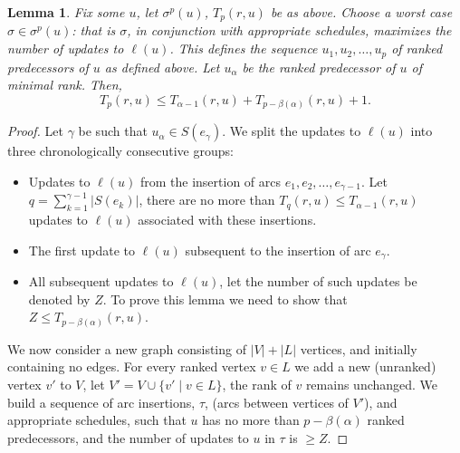 \documentclass[11pt]{article}
\theoremstyle{plain}
\newtheorem{lem}[thm]{Lemma}
\theoremstyle{definition}
\theoremstyle{remark}
\numberwithin{equation}{section}
\begin{document}
\begin{lem}
\label{lem:mapping} Fix some $u$,
  let $\sigma^p(u)$, $T_p(r,u)$ be as above. Choose a worst case $\sigma\in \sigma^p(u)$: that is $\sigma$, in conjunction with appropriate schedules, maximizes the number of updates to $\ell(u)$.
  This defines the sequence  $u_1,u_2,\ldots,u_p$ of ranked predecessors of $u$ as defined above.
  Let $u_\alpha$ be the ranked predecessor of $u$ of minimal rank. Then, $$T_p(r,u) \leq T_{\alpha-1}(r,u) + T_{p-\beta(\alpha)}(r,u) + 1.$$
\end{lem}
\begin{proof}
  Let $\gamma$ be such that $u_{\alpha} \in S(e_\gamma)$.
  We split the updates to $\ell(u)$ into three chronologically consecutive groups:
  \begin{itemize}
    \item Updates to $\ell(u)$ from the insertion of arcs $e_1, e_2, \ldots, e_{\gamma-1}$. Let $q=\sum_{k=1}^{\gamma-1} |S(e_k)|$, there are no more than $T_q(r,u) \leq T_{\alpha-1}(r,u)$ updates to $\ell(u)$ associated with these insertions.
    \item The first update to $\ell(u)$ subsequent to the insertion of arc $e_\gamma$.
    \item \label{split:hard} All subsequent updates to $\ell(u)$, let the number of such updates be denoted by $Z$. To prove this lemma we need to show that
    $Z\leq T_{p-\beta(\alpha)}(r,u)$.
  \end{itemize}

  We now consider a new graph consisting of $|V|+|L|$ vertices, and initially containing no edges.
  For every ranked vertex $v\in L$ we add a new (unranked) vertex $v'$ to $V$, let $V'= V \cup \{v' \mid v\in L\}$, the rank of $v$ remains unchanged.
   We build a sequence of arc insertions, $\tau$, (arcs between vertices of $V'$), and appropriate schedules, such that $u$ has no more than
   $p-\beta(\alpha)$ ranked predecessors, and the number of updates to $u$ in $\tau$ is $\geq Z$.


\end{proof}
\end{document}
